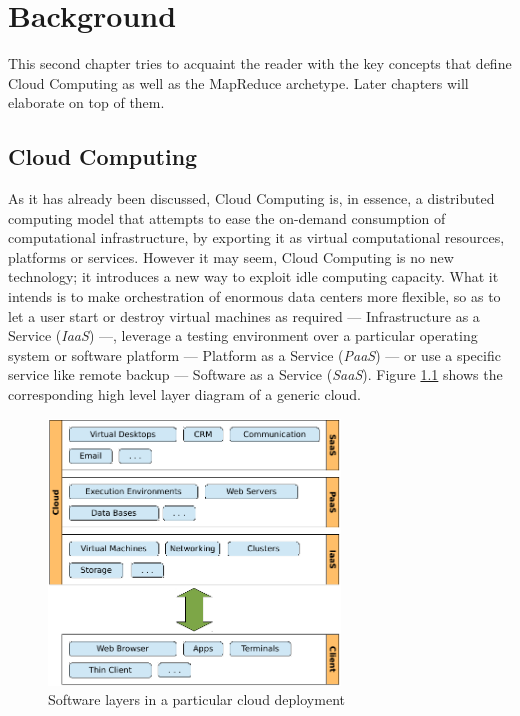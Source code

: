 \chapter{Background}\label{cap:estadodelarte}
\noindent This second chapter tries to acquaint the reader with the key concepts that define Cloud Computing as well as the MapReduce archetype. Later chapters will elaborate on top of them.

\section{Cloud Computing}\label{sec:computacioncloud}
\noindent As it has already been discussed, Cloud Computing is, in essence, a distributed computing model that attempts to ease the on-demand consumption of computational infrastructure, by exporting it as virtual computational resources, platforms or services. However it may seem, Cloud Computing is no new technology; it introduces a new way to exploit idle computing capacity. What it intends is to make orchestration of enormous data centers more flexible, so as to let a user start or destroy virtual machines as required --- Infrastructure as a Service (\emph{IaaS}) ---, leverage a testing environment over a particular operating system or software platform --- Platform as a Service (\emph{PaaS}) --- or use a specific service like remote backup --- Software as a Service (\emph{SaaS}). Figure \ref{fig:cloudlayers} shows the corresponding high level layer diagram of a generic cloud.

\begin{figure}[tbp]
\begin{center}
\includegraphics[width=0.69\textwidth]{imagenes/003.pdf}
 \caption{Software layers in a particular cloud deployment}
\label{fig:cloudlayers}
\end{center}
\end{figure}

